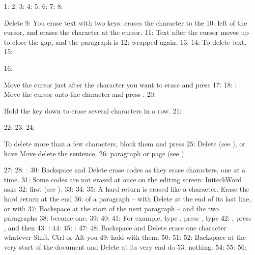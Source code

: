 1: %
2: %
3: %
4: %
5: %
6: %
7: 
8: \begin{Feature}{Delete}
9: You erase text with two keys:  erases the character to the
10: left of the cursor, and  erases the character at the cursor.
11: Text after the cursor moves up to close the gap, and the paragraph is
12: wrapped again.
13: 
14: To delete text,
15: \begin{WPSteps}
16: \item Move the cursor just after the character you want to erase and press
17: 
18: : Move the cursor onto the character and press .
20: \item Hold the key down to erase several characters in a row.
21: \end{WPSteps}
22: 
23: 
24: \begin{WPNote}To delete more than a few characters, block them and press
25: Delete (see ), or have Move delete the sentence,
26: paragraph or page (see ).\end{WPNote}
27: 
28: : 
30: Backspace and Delete erase codes as they erase characters, one at a time.
31: Some codes are not erased at once on the editing screen: InitechWord asks
32: first (see ).
33: 
34: 
35: A hard return is erased like a character.  Erase the hard return at the end
36: of a paragraph -- with Delete at the end of its last line, or with
37: Backspace at the start of the next paragraph -- and the two paragraphs
38: become one.
39: 
40: 
41: For example, type , press , type
42: , press ,  and then
43: :
44: 
45: : 
47: 
48: Backspace and Delete erase one character whatever Shift, Ctrl or Alt you
49: hold with them.
50: 
51: 
52: Backspace at the very start of the document and Delete at its very end do
53: nothing.
54: 
55: 
56: \end{Feature}
